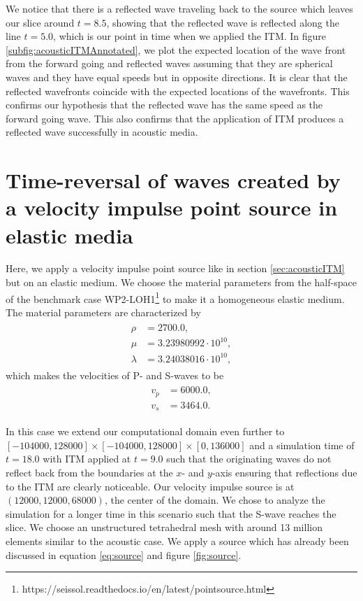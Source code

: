 We notice that there is a reflected wave traveling back to the source which leaves our slice around $t=8.5$, showing that the reflected wave
is reflected along the line $t=5.0$, which is our point in time when we applied the \ac{ITM}. In figure \ref{subfig:acousticITMAnnotated}, we plot the expected
location of the wave front from the forward going and reflected waves assuming that they are spherical waves and they have equal speeds but in opposite directions. 
It is clear that the reflected wavefronts coincide with the expected locations of the wavefronts. This confirms our hypothesis that the reflected wave has the same speed
as the forward going wave. This also confirms that the application of \ac{ITM} produces a reflected wave successfully in acoustic media.

\section{Time-reversal of waves created by a velocity impulse point source in elastic media} \label{sec:elasticITM}
Here, we apply a velocity impulse point source like in section \ref{sec:acousticITM} but on an elastic medium. We choose the material parameters from the half-space of the 
benchmark case WP2-LOH1\footnote[1]{https://seissol.readthedocs.io/en/latest/pointsource.html} to make it a homogeneous elastic medium. The material parameters 
are characterized by
\begin{align}
    \begin{split}
        \rho &=    2700.0 ,\\
        \mu &=     3.23980992 \cdot 10^{10} ,\\
        \lambda &= 3.24038016 \cdot 10^{10} ,
    \end{split}
\end{align}
which makes the velocities of P- and S-waves to be
\begin{align}
    \begin{split}
        v_p &= 6000.0 ,\\
        v_s &= 3464.0 .
    \end{split}
\end{align}

In this case we extend our computational domain even further to $\left[-104000,128000\right] \times \left[-104000,128000\right] \times \left[0,136000\right]$ and a simulation time of $t=18.0$ with \ac{ITM} applied at $t=9.0$
such that the originating waves do not reflect back from the boundaries at the $x$- and $y$-axis ensuring that reflections due to the \ac{ITM} are clearly noticeable.
Our velocity impulse source is at $\left(12000,12000,68000\right)$, the center of the domain.
We chose to analyze the simulation for a longer time in this scenario such that the S-wave reaches the slice. We choose an unstructured tetrahedral mesh with around 13 million elements similar to the acoustic case. 
We apply a source which has already been discussed in equation \ref{eq:source} and figure \ref{fig:source}.


